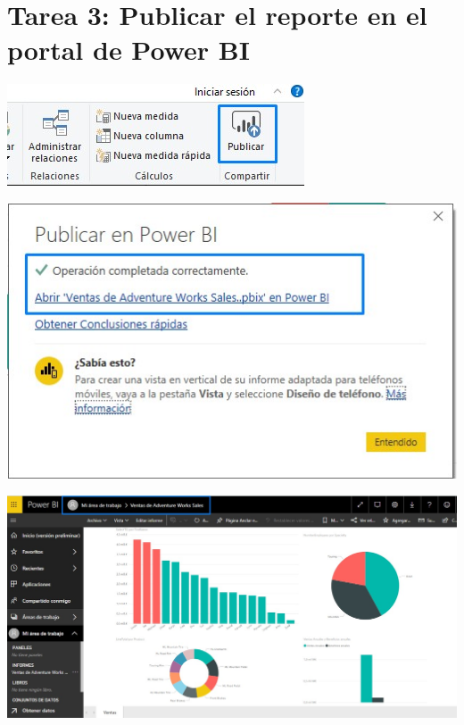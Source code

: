 \section{Tarea 3: Publicar el reporte en el portal de Power BI}

\begin{center}
\includegraphics{images/task3/task3-01}\newline
\end{center}

\begin{center}
\includegraphics{images/task3/task3-03}\newline
\end{center}

\begin{center}
\includegraphics[width=\columnwidth]{images/task3/task3-04}\newline
\end{center}